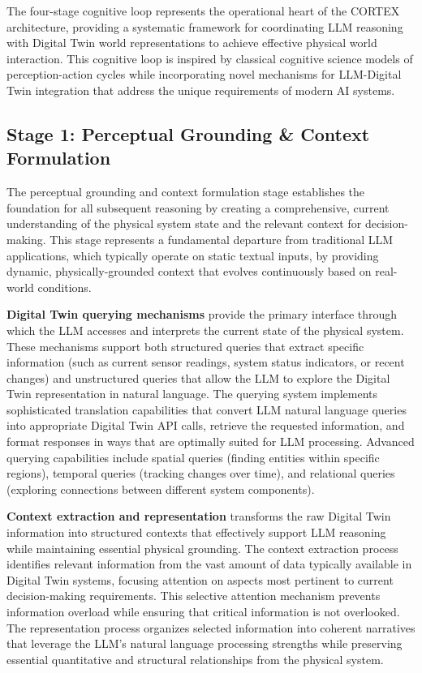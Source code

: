 The four-stage cognitive loop represents the operational heart of the CORTEX architecture, providing a systematic framework for coordinating LLM reasoning with Digital Twin world representations to achieve effective physical world interaction. This cognitive loop is inspired by classical cognitive science models of perception-action cycles while incorporating novel mechanisms for LLM-Digital Twin integration that address the unique requirements of modern AI systems.

\subsection{Stage 1: Perceptual Grounding \& Context Formulation}

The perceptual grounding and context formulation stage establishes the foundation for all subsequent reasoning by creating a comprehensive, current understanding of the physical system state and the relevant context for decision-making. This stage represents a fundamental departure from traditional LLM applications, which typically operate on static textual inputs, by providing dynamic, physically-grounded context that evolves continuously based on real-world conditions.

\textbf{Digital Twin querying mechanisms} provide the primary interface through which the LLM accesses and interprets the current state of the physical system. These mechanisms support both structured queries that extract specific information (such as current sensor readings, system status indicators, or recent changes) and unstructured queries that allow the LLM to explore the Digital Twin representation in natural language. The querying system implements sophisticated translation capabilities that convert LLM natural language queries into appropriate Digital Twin API calls, retrieve the requested information, and format responses in ways that are optimally suited for LLM processing. Advanced querying capabilities include spatial queries (finding entities within specific regions), temporal queries (tracking changes over time), and relational queries (exploring connections between different system components).

\textbf{Context extraction and representation} transforms the raw Digital Twin information into structured contexts that effectively support LLM reasoning while maintaining essential physical grounding. The context extraction process identifies relevant information from the vast amount of data typically available in Digital Twin systems, focusing attention on aspects most pertinent to current decision-making requirements. This selective attention mechanism prevents information overload while ensuring that critical information is not overlooked. The representation process organizes selected information into coherent narratives that leverage the LLM's natural language processing strengths while preserving essential quantitative and structural relationships from the physical system.

